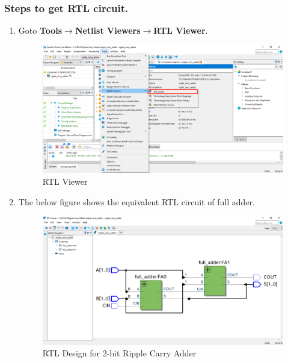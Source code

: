 \documentclass[12pt,singleside,a4paper]{article}
\begin{document}
    \subsubsection*{Steps to get RTL circuit.}
    \vspace{4mm}
        \begin{enumerate}
            \item Goto \textbf{Tools}$\rightarrow$\textbf{Netlist Viewers}$\rightarrow$\textbf{RTL Viewer}.
            \vspace{6mm}
                \begin{figure}[H]
                     \centering
                  \includegraphics[width=14cm,keepaspectratio]{img9.png}
                \caption{RTL Viewer}
                \end{figure}
                \newpage
            \item The below figure shows the equivalent RTL circuit of full adder.      
\begin{figure}[H]
    \centering
    \includegraphics[width=14cm,keepaspectratio]{img10.png}
    \caption{RTL Design for 2-bit Ripple Carry Adder}
\end{figure}
\end{enumerate}
\end{document}
